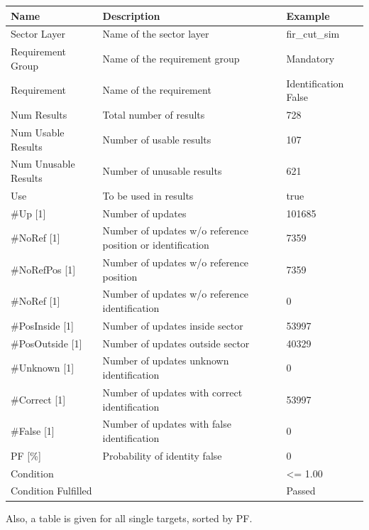 \begin{center}
 \begin{table}[H]
  \begin{tabularx}{\textwidth}{ | l | X |  l | }
    \hline
    \textbf{Name} & \textbf{Description} & \textbf{Example} \\ \hline
    Sector Layer & Name of the sector layer & fir\_cut\_sim \\ \hline
    Requirement Group & Name of the requirement group & Mandatory \\ \hline
    Requirement & Name of the requirement & Identification False \\ \hline
    Num Results & Total number of results & 728 \\ \hline
    Num Usable Results & Number of usable results & 107 \\ \hline
    Num Unusable Results & Number of unusable results & 621 \\ \hline
    Use & To be used in results & true \\ \hline
    \#Up [1] & Number of updates & 101685 \\ \hline
    \#NoRef [1] & Number of updates w/o reference position or identification & 7359 \\ \hline
    \#NoRefPos [1] & Number of updates w/o reference position  & 7359 \\ \hline
    \#NoRef [1] & Number of updates w/o reference identification & 0 \\ \hline
    \#PosInside [1] & Number of updates inside sector & 53997 \\ \hline
    \#PosOutside [1] & Number of updates outside sector & 40329 \\ \hline
    \#Unknown [1] & Number of updates unknown identification & 0 \\ \hline
    \#Correct [1] & Number of updates with correct identification & 53997 \\ \hline
    \#False [1] & Number of updates with false identification & 0 \\ \hline
    PF [\%] & Probability of identity false & 0 \\ \hline
    Condition &  & <= 1.00 \\ \hline
    Condition Fulfilled &  & Passed \\ \hline
\end{tabularx}
\end{table}
\end{center}

Also, a table is given for all single targets, sorted by PF.

